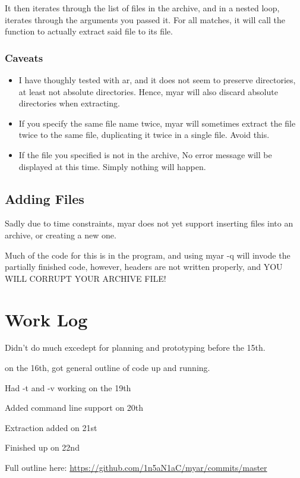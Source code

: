 \documentclass[letterpaper,10pt,titlepage]{article}
\begin{document}
It then iterates through the list of files in the archive, and in a nested loop, iterates through the arguments you passed it.  For all matches, it will call the function to actually extract said file to its file.

\subsubsection{Caveats}

\begin{itemize}
\item I have thoughly tested with ar, and it does not seem to preserve directories, at least not absolute directories.  Hence, myar will also discard absolute directories when extracting.
\item If you specify the same file name twice, myar will sometimes extract the file twice to the same file, duplicating it twice in a single file.  Avoid this.
\item If the file you specified is not in the archive, No error message will be displayed at this time.  Simply nothing will happen.
\end{itemize}

\subsection{Adding Files}

Sadly due to time constraints, myar does not yet support inserting files into an archive, or creating a new one.

Much of the code for this is in the program, and using myar -q will invode the partially finished code, however, headers are not written properly, and YOU WILL CORRUPT YOUR ARCHIVE FILE!

\section{Work Log}

Didn't do much excedept for planning and prototyping before the 15th.

on the 16th, got general outline of code up and running.

Had -t and -v working on the 19th

Added command line support on 20th

Extraction added on 21st

Finished up on 22nd

Full outline here: \url{https://github.com/1n5aN1aC/myar/commits/master}
\end{document}
